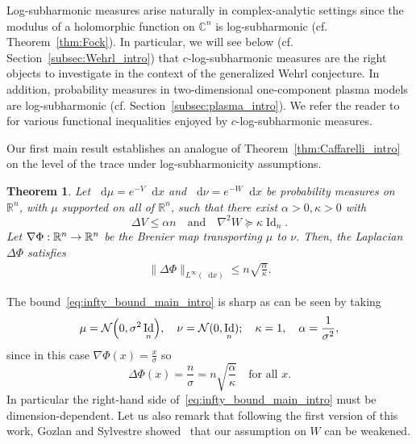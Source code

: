 \documentclass[10pt]{amsart}
\newtheorem{theo}{Theorem}[section]
\theoremstyle{definition}\newtheorem{defi}[theo]{Definition}\newtheorem{rema}[theo]{Remark}\newtheorem{exam}[theo]{Example}\newtheorem{exem}[theo]{Example}\newtheorem{nota}[theo]{Notation}
\newcommand{\R}{\mathbb R}
\newcommand{\C}{\mathbb C}
\DeclareMathOperator{\Id}{Id}
\newcommand{\V}{V}
\newcommand{\W}{W}
\newcommand{\dd}{n}
\newcommand{\conv}{c}
\newcommand{\source}{\mu}
\newcommand{\target}{\nu}
\newcommand{\lsh}{\alpha}
\newcommand{\lc}{\kappa}
\newcommand*\diff{\mathop{}\!\mathrm{d}}
\newcommand{\clN}{\mathcal{N}}
\newcommand{\OT}{\Phi}
\renewcommand*{\to}{\mathchoice{\longrightarrow}{\rightarrow}{\rightarrow}{\rightarrow}}
\let\originalleft\left
\let\originalright\right
\renewcommand{\left}{\mathopen{}\mathclose\bgroup\originalleft}
\renewcommand{\right}{\aftergroup\egroup\originalright}
\begin{document}
Log-subharmonic measures arise naturally in complex-analytic settings since the modulus of a holomorphic function on $\C^{\dd}$ is log-subharmonic (cf. Theorem~\ref{thm:Fock}). In particular, we will see below (cf. Section~\ref{subsec:Wehrl_intro}) that $\conv$-log-subharmonic measures are the right objects to investigate in the context of the generalized Wehrl conjecture. In addition, probability measures in two-dimensional one-component plasma models are log-subharmonic (cf. Section~\ref{subsec:plasma_intro}). We refer the reader to~\cite{MR4632741,MR2134401, MR2578455, MR3415657} for various functional inequalities enjoyed by $\conv$-log-subharmonic measures.


Our first main result establishes an analogue of Theorem~\ref{thm:Caffarelli_intro} on the level of the trace under log-subharmonicity assumptions.
\begin{theo}\label{thm:main_OT_Lp_intro}
Let $\diff\source=e^{-\V}\diff x$ and $\diff\target=e^{-\W}\diff x$ be probability measures on~$\R^{\dd}$, with $\source$ supported on all of $\R^{\dd}$, such that there exist $\lsh>0,\lc>0$ with
\[
\Delta \V \le \lsh\dd \quad\text{and}\quad \nabla^2\W \succeq \lc \Id_{\dd}.
\]
Let $\nabla\OT:\R^{\dd}\to\R^{\dd}$ be the Brenier map transporting $\source$ to $\target$. Then, the Laplacian $\Delta\OT$ satisfies
\begin{align}\label{eq:infty_bound_main_intro}
\|\Delta\OT\|_{L^{\infty}(\diff x)}\le \dd\sqrt{ \frac{\lsh}{\lc}}.
\end{align}
\end{theo}

The bound~\eqref{eq:infty_bound_main_intro} is sharp as can be seen by taking
\[
\source=\clN\left(0,\sigma^2\Id_{\dd}\right),\quad \target=\clN(0,\Id_{\dd}); \quad \lc=1, \quad \lsh=\frac{1}{\sigma^2},
\]
since in this case $\nabla \OT(x)=\frac{x}{\sigma}$ so
\[
\Delta\OT(x)=\frac{\dd}{\sigma}=\dd\sqrt{\frac{\lsh}{\lc}}\quad \text{for all }x.
\]
In particular the right-hand side of~\eqref{eq:infty_bound_main_intro} must be dimension-dependent. Let us also remark that following the first version of this work, Gozlan and Sylvestre showed~\cite[\S 6]{gozlan2025global} that our assumption on $\W$ can be weakened.
\end{document}
